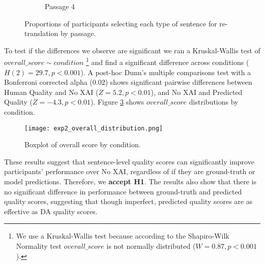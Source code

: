 \begin{figure}
\begin{subfigure}[t]{0.45\textwidth}
{\begin{bchart}[step=.25,max=1,width=\linewidth]
        \bcskip{6pt}
        
        
        \end{bchart}}
        \caption{Passage 4} 
        \label{fig:exp_p4_prop_answers}
    \end{subfigure}
    
    \caption{Proportions of participants selecting each type of sentence for re-translation by passage.}
    \label{fig:exp_prop_answers}

\end{figure}

To test if the differences we observe are significant we ran a Kruskal-Wallis test of $overall\_score \sim condition$ \footnote{We use a Kruskal-Wallis test because according to the Shapiro-Wilk Normality test $overall\_score$ is not normally distributed ($W = 0.87, p < 0.001$).} and find a significant difference across conditions ($H(2) = 29.7, p < 0.001$). A post-hoc Dunn’s multiple comparisons test with a Bonferroni corrected alpha ($0.02$) shows significant pairwise differences between Human Quality and No XAI ($Z = 5.2, p < 0.01$), and No XAI and Predicted Quality ($Z = -4.3, p < 0.01$). Figure \ref{fig:exp_overall_distribution} shows $overall\_score$ distributions by condition. 

\begin{figure}[h!]
    \centering
    \texttt{[image: exp2\_overall\_distribution.png]}
    \caption{Boxplot of overall score by condition.}
    \label{fig:exp_overall_distribution}
\end{figure}

These results suggest that sentence-level quality scores can significantly improve participants’ performance over No XAI, regardless of if they are ground-truth or model predictions. Therefore, we \textbf{accept H1}. The results also show that there is no significant difference in performance between ground-truth and predicted quality scores, suggesting that though imperfect, predicted quality scores are as effective as DA quality scores. 

